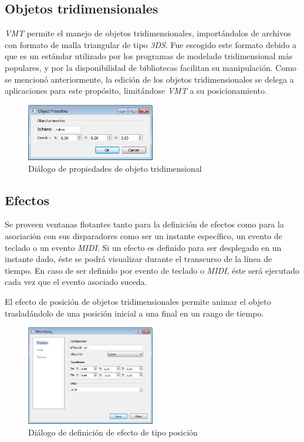 \subsection{Objetos tridimensionales}

\emph{VMT} permite el manejo de objetos tridimensionales, importándolos de archivos con formato de malla triangular de tipo \emph{3DS}.
Fue escogido este formato debido a que es un estándar utilizado por los programas de modelado tridimensional más populares, y por la disponibilidad de bibliotecas facilitan su manipulación.
Como se mencionó anteriormente, la edición de los objetos tridimensionales se delega a aplicaciones para este propósito, limitándose \emph{VMT} a su posicionamiento.

\begin{figure}[H]
  \centering
    \includegraphics[width=0.5\textwidth]{./Cap5_vmt/vmt_objectProperties.png}
  \caption[Imagen propia.]{Diálogo de propiedades de objeto tridimensional}
  \label{fig:VMT-ObjectProperties}
\end{figure}

\subsection{Efectos}

Se proveen ventanas flotantes tanto para la definición de efectos como para la asociación con sus disparadores como ser un instante específico, un evento de teclado o un evento \emph{MIDI}.
Si un efecto es definido para ser desplegado en un instante dado, éste se podrá visualizar durante el transcurso de la línea de tiempo. En caso de ser definido por evento de teclado o \emph{MIDI}, éste será ejecutado cada vez que el evento asociado suceda.

El efecto de posición de objetos tridimensionales permite animar el objeto trasladándolo de una posición inicial a una final en un rango de tiempo.

\begin{figure}[H]
  \centering
    \includegraphics[width=0.5\textwidth]{./Cap5_vmt/vmt_EfectDialog1.png}
  \caption[Imagen propia.]{Diálogo de definición de efecto de tipo posición}
  \label{fig:VMT-EffectPossition}
\end{figure}

